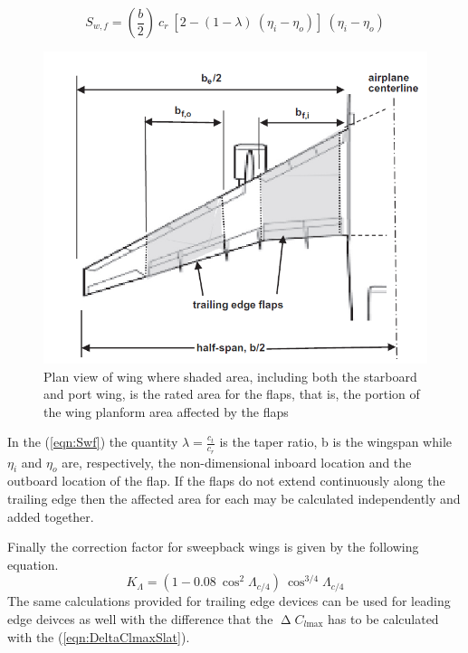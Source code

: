 %
\begin{equation}
S_{w,f}=\left(\dfrac{b}{2}\right)\ c_r\ \left[2-\left(1-\lambda\right)\ \left(\eta_i-\eta_o\right)\right]\ \left(\eta_i-\eta_o\right)
\label{eqn:Swf}
\end{equation}
%
\begin{figure}[!b]
\centering
\includegraphics[width=0.75\linewidth]{Swf}
\caption{Plan view of wing where shaded area, including both the starboard and port wing, is the rated area for the flaps, that is, the portion of the wing planform area affected by the flaps}
\label{fig:Swf}
\end{figure}
%
\noindent
In the (\ref{eqn:Swf}) the quantity $\lambda = \frac{c_t}{c_r}$ is the taper ratio, b is the wingspan while $\eta_i$ and $\eta_o$ are, respectively, the non-dimensional inboard location and the outboard location of the flap. If the flaps do not extend continuously along the trailing edge then the affected area for each may be calculated independently and added together.

\bigskip
\noindent
Finally the correction factor for sweepback wings is given by the following equation.
%
\begin{equation}
K_\Lambda=\left(1-0.08\ \cos^2\Lambda_{c/4}\right)\ \cos^{3/4}\Lambda_{c/4}
\label{eqn:KLambda}
\end{equation}
%
\noindent
The same calculations provided for trailing edge devices can be used for leading edge deivces as well with the difference that the $\upDelta C_{l\text{max}}$ has to be calculated with the (\ref{eqn:DeltaClmaxSlat}). 
%
